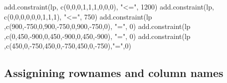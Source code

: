 \documentclass[
]{article}
\newenvironment{Shaded}{\begin{snugshade}}{\end{snugshade}}
\newcommand{\DecValTok}[1]{\textcolor[rgb]{0.00,0.00,0.81}{#1}}
\newcommand{\FunctionTok}[1]{\textcolor[rgb]{0.00,0.00,0.00}{#1}}
\newcommand{\NormalTok}[1]{#1}
\newcommand{\SpecialCharTok}[1]{\textcolor[rgb]{0.00,0.00,0.00}{#1}}
\newcommand{\StringTok}[1]{\textcolor[rgb]{0.31,0.60,0.02}{#1}}
\begin{document}
\begin{Shaded}
\begin{Highlighting}[]
\FunctionTok{add.constraint}\NormalTok{(lp, }\FunctionTok{c}\NormalTok{(}\DecValTok{0}\NormalTok{,}\DecValTok{0}\NormalTok{,}\DecValTok{0}\NormalTok{,}\DecValTok{1}\NormalTok{,}\DecValTok{1}\NormalTok{,}\DecValTok{1}\NormalTok{,}\DecValTok{0}\NormalTok{,}\DecValTok{0}\NormalTok{,}\DecValTok{0}\NormalTok{), }\StringTok{"\textless{}="}\NormalTok{, }\DecValTok{1200}\NormalTok{)}
\FunctionTok{add.constraint}\NormalTok{(lp, }\FunctionTok{c}\NormalTok{(}\DecValTok{0}\NormalTok{,}\DecValTok{0}\NormalTok{,}\DecValTok{0}\NormalTok{,}\DecValTok{0}\NormalTok{,}\DecValTok{0}\NormalTok{,}\DecValTok{0}\NormalTok{,}\DecValTok{1}\NormalTok{,}\DecValTok{1}\NormalTok{,}\DecValTok{1}\NormalTok{), }\StringTok{"\textless{}="}\NormalTok{, }\DecValTok{750}\NormalTok{)}
\FunctionTok{add.constraint}\NormalTok{(lp ,}\FunctionTok{c}\NormalTok{(}\DecValTok{900}\NormalTok{,}\SpecialCharTok{{-}}\DecValTok{750}\NormalTok{,}\DecValTok{0}\NormalTok{,}\DecValTok{900}\NormalTok{,}\SpecialCharTok{{-}}\DecValTok{750}\NormalTok{,}\DecValTok{0}\NormalTok{,}\DecValTok{900}\NormalTok{,}\SpecialCharTok{{-}}\DecValTok{750}\NormalTok{,}\DecValTok{0}\NormalTok{), }\StringTok{"="}\NormalTok{, }\DecValTok{0}\NormalTok{)}
\FunctionTok{add.constraint}\NormalTok{(lp ,}\FunctionTok{c}\NormalTok{(}\DecValTok{0}\NormalTok{,}\DecValTok{450}\NormalTok{,}\SpecialCharTok{{-}}\DecValTok{900}\NormalTok{,}\DecValTok{0}\NormalTok{,}\DecValTok{450}\NormalTok{,}\SpecialCharTok{{-}}\DecValTok{900}\NormalTok{,}\DecValTok{0}\NormalTok{,}\DecValTok{450}\NormalTok{,}\SpecialCharTok{{-}}\DecValTok{900}\NormalTok{), }\StringTok{"="}\NormalTok{, }\DecValTok{0}\NormalTok{)}
\FunctionTok{add.constraint}\NormalTok{(lp ,}\FunctionTok{c}\NormalTok{(}\DecValTok{450}\NormalTok{,}\DecValTok{0}\NormalTok{,}\SpecialCharTok{{-}}\DecValTok{750}\NormalTok{,}\DecValTok{450}\NormalTok{,}\DecValTok{0}\NormalTok{,}\SpecialCharTok{{-}}\DecValTok{750}\NormalTok{,}\DecValTok{450}\NormalTok{,}\DecValTok{0}\NormalTok{,}\SpecialCharTok{{-}}\DecValTok{750}\NormalTok{),}\StringTok{"="}\NormalTok{,}\DecValTok{0}\NormalTok{)}
\end{Highlighting}
\end{Shaded}

\hypertarget{assignining-rownames-and-column-names}{%
\subsection{Assignining rownames and column
names}\label{assignining-rownames-and-column-names}}
\end{document}
